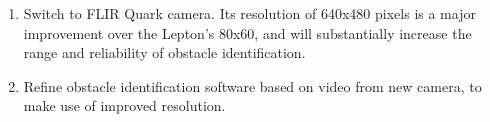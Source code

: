 \begin{enumerate}
  \item Switch to FLIR Quark camera.  Its resolution of 640x480 pixels is a major improvement over the Lepton's 80x60, and will substantially increase the range and reliability of obstacle identification.
  \item Refine obstacle identification software based on video from new camera, to make use of improved resolution.
\end{enumerate}
